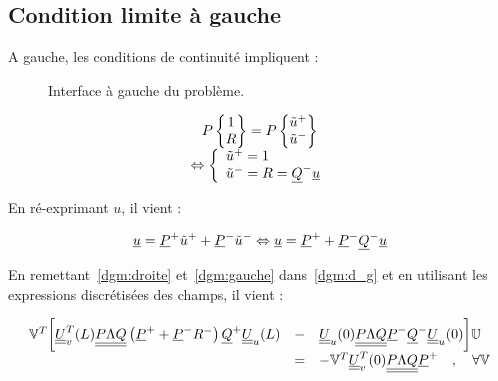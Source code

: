 \subsection{Condition limite à gauche}

A gauche, les conditions de continuité impliquent :

\begin{figure}[!ht]
	\centering
	
    \caption{\label{fig:interface}Interface à gauche du problème.}
\end{figure}

\begin{equation*}
    \begin{array}{c}
        P\begin{Bmatrix}1\\R\end{Bmatrix} = P\begin{Bmatrix}\tilde{u}^+\\\tilde{u}^-\end{Bmatrix}\\
            \Leftrightarrow \left\{\begin{array}{l}
                    \tilde{u}^+ = 1\\
                    \tilde{u}^- = R = \underline{Q}^-\underline{u}
            \end{array}\right.
    \end{array}
\end{equation*}

En ré-exprimant $u$, il vient :

\begin{equation}
    \underline{u} = \underline{P}^+\tilde{u}^+ + \underline{P}^-\tilde{u}^- \Leftrightarrow \underline{u} = \underline{P}^+ + \underline{P}^-\underline{Q}^-\underline{u}\label{dgm:gauche}
\end{equation}

En remettant~\eqref{dgm:droite} et~\eqref{dgm:gauche} dans~\eqref{dgm:d_g} et en utilisant les expressions discrétisées
des champs, il vient :

\begin{equation}
    \begin{array}{rcl}
        \mathbb{V}^T\bigg[\underline{\underline{U}}_v^T(L)\underline{\underline{P\Lambda Q}}\left(\underline{P}^+ + \underline{P}^-R^-\right)\underline{Q}^+\underline{\underline{U}}_u(L) & - &
    \underline{\underline{U}}_u(0)\underline{\underline{P\Lambda Q}}\underline{P}^-\underline{Q}^-\underline{\underline{U}}_u(0)\bigg] \mathbb{U}\\
    & = & - \mathbb{V}^T\underline{\underline{U}}_v^T(0)\underline{\underline{P\Lambda Q}}\underline{P}^+ \quad,\quad \forall\mathbb{V}
    \end{array}
\end{equation}

